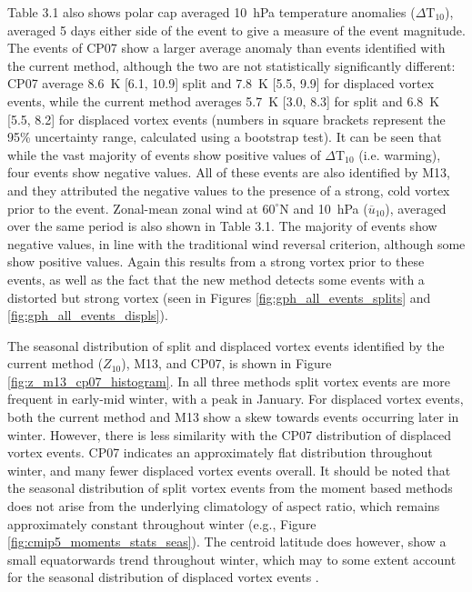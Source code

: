 Table 3.1 also shows polar cap averaged 10~hPa temperature anomalies
($\Delta \mathrm{T}_{10}$), averaged 5 days either side of the event to give a
measure of the event magnitude. The events of CP07 show a larger average anomaly
than events identified with the current method, although the two are not
statistically significantly different: CP07 average 8.6~K [6.1, 10.9] split and
7.8~K [5.5, 9.9] for displaced vortex events, while the current method averages
5.7~K [3.0, 8.3] for split and 6.8~K [5.5, 8.2] for displaced vortex events
(numbers in square brackets represent the 95\% uncertainty range, calculated
using a bootstrap test). It can be seen that while the vast majority of events
show positive values of $\Delta \mathrm{T}_{10}$ (i.e. warming), four events
show negative values. All of these events are also identified by M13, and they
attributed the negative values to the presence of a strong, cold vortex prior to
the event. Zonal-mean zonal wind at $60^{\circ}$N and 10~hPa
($\overline{u}_{10}$), averaged over the same period is also shown in Table
3.1. The majority of events show negative values, in line with the traditional
wind reversal criterion, although some show positive values. Again this results
from a strong vortex prior to these events, as well as the fact that the new
method detects some events with a distorted but strong vortex (seen in Figures
\ref{fig:gph_all_events_splits} and \ref{fig:gph_all_events_displs}).



The seasonal distribution of split and displaced vortex events identified by the
current method ($Z_{10}$), M13, and CP07, is shown in Figure
\ref{fig:z_m13_cp07_histogram}. In all three methods split vortex events are
more frequent in early-mid winter, with a peak in January. For displaced vortex
events, both the current method and M13 show a skew towards events occurring
later in winter. However, there is less similarity with the CP07 distribution of
displaced vortex events. CP07 indicates an approximately flat distribution
throughout winter, and many fewer displaced vortex events overall. It should be
noted that the seasonal distribution of split vortex events from the moment
based methods does not arise from the underlying climatology of aspect ratio,
which remains approximately constant throughout winter (e.g., Figure
\ref{fig:cmip5_moments_stats_seas}). The centroid latitude does however, show a
small equatorwards trend throughout winter, which may to some extent account for
the seasonal distribution of displaced vortex events \citep{Mitchell2011}.

